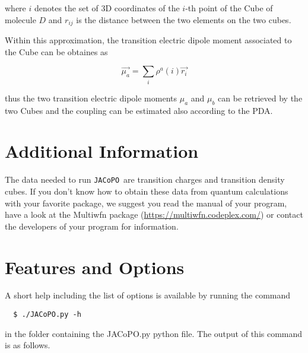 \documentclass[a4paper]{article}
\newcommand{\jacopo}{\texttt{JACoPO}}
\begin{document}
where $i$ denotes the set of 3D coordinates of the $i$-th point of the Cube of molecule $D$ and $r_{ij}$ is the distance between the two elements on the two cubes.

Within this approximation, the transition electric dipole moment associated to the Cube can be obtaines as

\begin{equation}
 \vec{\mu_a} = \sum_i \rho^a(i) \vec{r_i}
 \label{eq:mu_TDC}
\end{equation}

thus the two transition electric dipole moments $\mu_a$ and $\mu_b$ can be retrieved by the two Cubes and the coupling can be estimated also according to the PDA.

\section*{Additional Information}
The data needed to run \jacopo\ are transition charges and transition density cubes. If you don't know how to obtain these data from quantum calculations with your favorite package, we suggest you read the manual of your program, have a look at the Multiwfn package (\url{https://multiwfn.codeplex.com/}) or contact the developers of your program for information.

\section*{Features and Options}
A short help including the list of options is available by running the command

\begin{verbatim}
  $ ./JACoPO.py -h
\end{verbatim}

in the folder containing the JACoPO.py python file. The output of this command is as follows.
\end{document}
